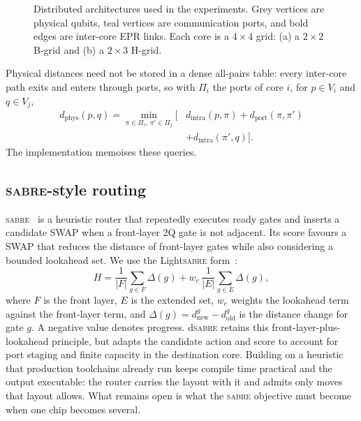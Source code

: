 \documentclass[journal]{IEEEtran}
\newcommand{\dSABRE}{d\textsc{sabre}}
\newcommand{\SABRE}{\textsc{sabre}}
\newcommand{\LightSABRE}{Light\textsc{sabre}}
\newcommand{\dphys}{d_{\mathrm{phys}}}
\newcommand{\dintra}{d_{\mathrm{intra}}}
\newcommand{\dport}{d_{\mathrm{port}}}
\begin{document}
\begin{figure}[t]
\centering
\resizebox{\columnwidth}{!}{}
\caption{Distributed architectures used in the experiments. Grey vertices are
physical qubits, teal vertices are communication ports, and bold edges are
inter-core EPR links. Each core is a $4\times4$ grid: (a) a $2\times2$
B-grid and (b) a $2\times3$ H-grid.}
\label{fig:arch}
\end{figure}

Physical distances need not be stored in a dense all-pairs table: every
inter-core path exits and enters through ports, so with $\Pi_i$ the ports of
core $i$, for $p\in V_i$ and $q\in V_j$,
\begin{equation}
\begin{split}
\dphys(p,q)=\min_{\pi\in\Pi_i,\,\pi'\in\Pi_j}\big[
  &\dintra(p,\pi)+\dport(\pi,\pi')\\
  &+\dintra(\pi',q)\big].
\end{split}
\label{eq:dphys}
\end{equation}
The implementation memoises these queries.

\subsection{\SABRE{}-style routing}
\label{sec:routing}

\SABRE{}~\cite{li2019tackling} is a heuristic router that repeatedly executes
ready gates and inserts a candidate SWAP when a front-layer 2Q gate is not
adjacent. Its score favours a SWAP that reduces the distance of
front-layer gates while also considering a bounded lookahead set. We use the
\LightSABRE{} form~\cite{zou2024lightsabrelightweightenhancedsabre}:
\begin{equation}
H = \frac{1}{|F|}\sum_{g\in F}\Delta(g)
+ w_e\,\frac{1}{|E|}\sum_{g\in E}\Delta(g),
\label{eq:sabre}
\end{equation}
where $F$ is the front layer, $E$ is the extended set, $w_e$ weights the
lookahead term against the front-layer term, and
$\Delta(g)=d^g_{\mathrm{new}}-d^g_{\mathrm{old}}$ is the distance change for
gate $g$. A negative value denotes progress. \dSABRE{} retains this
front-layer-plus-lookahead principle, but adapts the candidate action and
score to account for port staging and finite capacity in the destination core.
Building on a heuristic that production toolchains already run keeps compile
time practical and the output executable: the router carries the layout
with it and admits only moves that layout allows. What remains open is what
the \SABRE{} objective must become when one chip becomes several.
\end{document}
